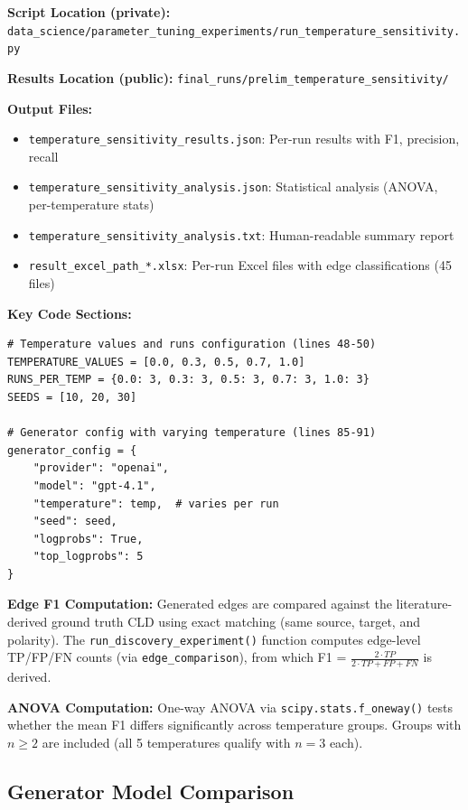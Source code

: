 \textbf{Script Location (private):} \texttt{data\_science/parameter\_tuning\_experiments/run\_temperature\_sensitivity.py}

\textbf{Results Location (public):} \texttt{final\_runs/prelim\_temperature\_sensitivity/}

\textbf{Output Files:}
\begin{itemize}[noitemsep]
    \item \texttt{temperature\_sensitivity\_results.json}: Per-run results with F1, precision, recall
    \item \texttt{temperature\_sensitivity\_analysis.json}: Statistical analysis (ANOVA, per-temperature stats)
    \item \texttt{temperature\_sensitivity\_analysis.txt}: Human-readable summary report
    \item \texttt{result\_excel\_path\_*.xlsx}: Per-run Excel files with edge classifications (45 files)
\end{itemize}

\textbf{Key Code Sections:}
\begin{verbatim}
# Temperature values and runs configuration (lines 48-50)
TEMPERATURE_VALUES = [0.0, 0.3, 0.5, 0.7, 1.0]
RUNS_PER_TEMP = {0.0: 3, 0.3: 3, 0.5: 3, 0.7: 3, 1.0: 3}
SEEDS = [10, 20, 30]

# Generator config with varying temperature (lines 85-91)
generator_config = {
    "provider": "openai",
    "model": "gpt-4.1",
    "temperature": temp,  # varies per run
    "seed": seed,
    "logprobs": True,
    "top_logprobs": 5
}
\end{verbatim}

\textbf{Edge F1 Computation:} Generated edges are compared against the literature-derived ground truth CLD using exact matching (same source, target, and polarity). The \texttt{run\_discovery\_experiment()} function computes edge-level TP/FP/FN counts (via \texttt{edge\_comparison}), from which F1 = $\frac{2 \cdot TP}{2 \cdot TP + FP + FN}$ is derived.

\textbf{ANOVA Computation:} One-way ANOVA via \texttt{scipy.stats.f\_oneway()} tests whether the mean F1 differs significantly across temperature groups. Groups with $n \geq 2$ are included (all 5 temperatures qualify with $n=3$ each).

\subsection{Generator Model Comparison}
\label{sec:generator_comparison}

